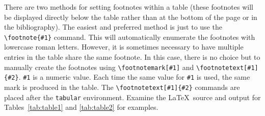 \documentclass[%
reprint,
amsmath,amssymb,
aps,
]{revtex4-2}
\begin{document}
		There are two methods for setting footnotes within a table (these
		footnotes will be displayed directly below the table rather than at
		the bottom of the page or in the bibliography). The easiest
		and preferred method is just to use the \verb+\footnote{#1}+
		command. This will automatically enumerate the footnotes with
		lowercase roman letters. However, it is sometimes necessary to have
		multiple entries in the table share the same footnote. In this case,
		there is no choice but to manually create the footnotes using
		\verb+\footnotemark[#1]+ and \verb+\footnotetext[#1]{#2}+.
		\texttt{\#1} is a numeric value. Each time the same value for
		\texttt{\#1} is used, the same mark is produced in the table. The
		\verb+\footnotetext[#1]{#2}+ commands are placed after the \texttt{tabular}
		environment. Examine the \LaTeX\ source and output for
		Tables~\ref{tab:table1} and \ref{tab:table2}
		for examples.
		
\end{document}
